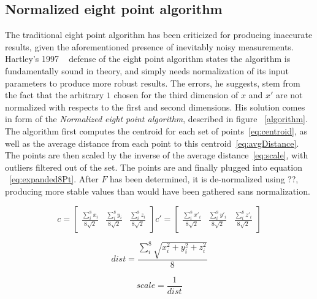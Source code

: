 \documentclass[Conference]{IEEEtran}
\begin{document}
\subsection{Normalized eight point algorithm}

The traditional eight point algorithm has been criticized for producing inaccurate results, given the aforementioned presence of inevitably noisy measurements.  Hartley’s 1997 ~\cite{Hartley:1997:DEA:262631.262634} defense of the eight point algorithm states the algorithm is fundamentally sound in theory, and simply needs normalization of its input parameters to produce more robust results. The errors, he suggests, stem from the fact that the arbitrary \(1\) chosen for the third dimension of \(x\) and \(x'\) are not normalized with respects to the first and second dimensions.
His solution comes in form of the \textit{Normalized eight point algorithm}, described in figure ~\ref{algorithm}. The algorithm first computes the centroid for each set of points~\eqref{eq:centroid}, as well as the average distance from each point to this centroid~\ref{eq:avgDistance}. The points are then scaled by the inverse of the average distance~\ref{eq:scale}, with outliers filtered out of the set. The points are and finally plugged into equation ~\ref{eq:expanded8Pt}. After \(F\) has been determined, it is de-normalized using ??, producing more stable values than would have been gathered sans normalization.


\begin{equation}\label{eq:centroid}
    c =\begin{bmatrix}
        \frac{\sum_{i}^{8}x_i}{8\sqrt{2}} & \frac{\sum_{i}^{8}y_i}{8\sqrt{2}} & \frac{\sum_{i}^{8}z_i}{8\sqrt{2}}
    \end{bmatrix}
    c' =\begin{bmatrix}
        \frac{\sum_{i}^{8}x'_i}{8\sqrt{2}} & \frac{\sum_{i}^{8}y'_i}{8\sqrt{2}} & \frac{\sum_{i}^{8}z'_i}{8\sqrt{2}}
    \end{bmatrix}
\end{equation}


\begin{equation}\label{eq:avgDistance}
    dist = \frac{
        \sum_{i}^{8}
        \sqrt{x_i^{2}+y_i^{2}+z_i^{2}}
    }{8}
\end{equation}

\begin{equation}\label{eq:scale}
    scale = \frac{1}{dist}
\end{equation}
\end{document}
